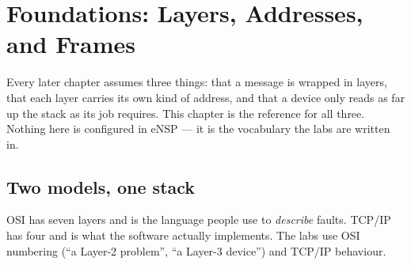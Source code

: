 \chapter*{Foundations: Layers, Addresses, and Frames}
\label{ch:foundations}

Every later chapter assumes three things: that a message is wrapped in
layers, that each layer carries its own kind of address, and that a
device only reads as far up the stack as its job requires. This chapter
is the reference for all three. Nothing here is configured in eNSP ---
it is the vocabulary the labs are written in.

\section*{Two models, one stack}
OSI has seven layers and is the language people use to \emph{describe}
faults. TCP/IP has four and is what the software actually implements.
The labs use OSI numbering (``a Layer-2 problem'', ``a Layer-3 device'')
and TCP/IP behaviour.

